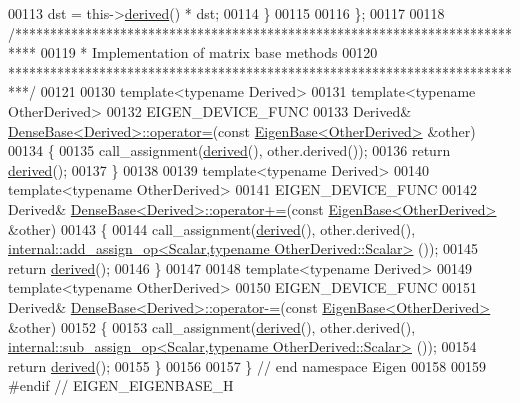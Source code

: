 \begin{DoxyCode}
00113     dst = this->\hyperlink{group___core___module_a324b16961a11d2ecfd2d1b7dd7946545}{derived}() * dst;
00114   \}
00115 
00116 \};
00117 
00118 \textcolor{comment}{/***************************************************************************}
00119 \textcolor{comment}{* Implementation of matrix base methods}
00120 \textcolor{comment}{***************************************************************************/}
00121 
00130 \textcolor{keyword}{template}<\textcolor{keyword}{typename} Derived>
00131 \textcolor{keyword}{template}<\textcolor{keyword}{typename} OtherDerived>
00132 EIGEN\_DEVICE\_FUNC
00133 Derived& \hyperlink{group___core___module_a581a7a353bd007b5352f11688e3bc5fa}{DenseBase<Derived>::operator=}(\textcolor{keyword}{const} 
      \hyperlink{group___core___module_struct_eigen_1_1_eigen_base}{EigenBase<OtherDerived>} &other)
00134 \{
00135   call\_assignment(\hyperlink{group___core___module_a324b16961a11d2ecfd2d1b7dd7946545}{derived}(), other.derived());
00136   \textcolor{keywordflow}{return} \hyperlink{group___core___module_a324b16961a11d2ecfd2d1b7dd7946545}{derived}();
00137 \}
00138 
00139 \textcolor{keyword}{template}<\textcolor{keyword}{typename} Derived>
00140 \textcolor{keyword}{template}<\textcolor{keyword}{typename} OtherDerived>
00141 EIGEN\_DEVICE\_FUNC
00142 Derived& \hyperlink{group___core___module_class_eigen_1_1_dense_base}{DenseBase<Derived>::operator+=}(\textcolor{keyword}{const} 
      \hyperlink{group___core___module_struct_eigen_1_1_eigen_base}{EigenBase<OtherDerived>} &other)
00143 \{
00144   call\_assignment(\hyperlink{group___core___module_a324b16961a11d2ecfd2d1b7dd7946545}{derived}(), other.derived(), 
      \hyperlink{struct_eigen_1_1internal_1_1add__assign__op}{internal::add\_assign\_op<Scalar,typename OtherDerived::Scalar>}
      ());
00145   \textcolor{keywordflow}{return} \hyperlink{group___core___module_a324b16961a11d2ecfd2d1b7dd7946545}{derived}();
00146 \}
00147 
00148 \textcolor{keyword}{template}<\textcolor{keyword}{typename} Derived>
00149 \textcolor{keyword}{template}<\textcolor{keyword}{typename} OtherDerived>
00150 EIGEN\_DEVICE\_FUNC
00151 Derived& \hyperlink{group___core___module_class_eigen_1_1_dense_base}{DenseBase<Derived>::operator-=}(\textcolor{keyword}{const} 
      \hyperlink{group___core___module_struct_eigen_1_1_eigen_base}{EigenBase<OtherDerived>} &other)
00152 \{
00153   call\_assignment(\hyperlink{group___core___module_a324b16961a11d2ecfd2d1b7dd7946545}{derived}(), other.derived(), 
      \hyperlink{struct_eigen_1_1internal_1_1sub__assign__op}{internal::sub\_assign\_op<Scalar,typename OtherDerived::Scalar>}
      ());
00154   \textcolor{keywordflow}{return} \hyperlink{group___core___module_a324b16961a11d2ecfd2d1b7dd7946545}{derived}();
00155 \}
00156 
00157 \} \textcolor{comment}{// end namespace Eigen}
00158 
00159 \textcolor{preprocessor}{#endif // EIGEN\_EIGENBASE\_H}
\end{DoxyCode}
